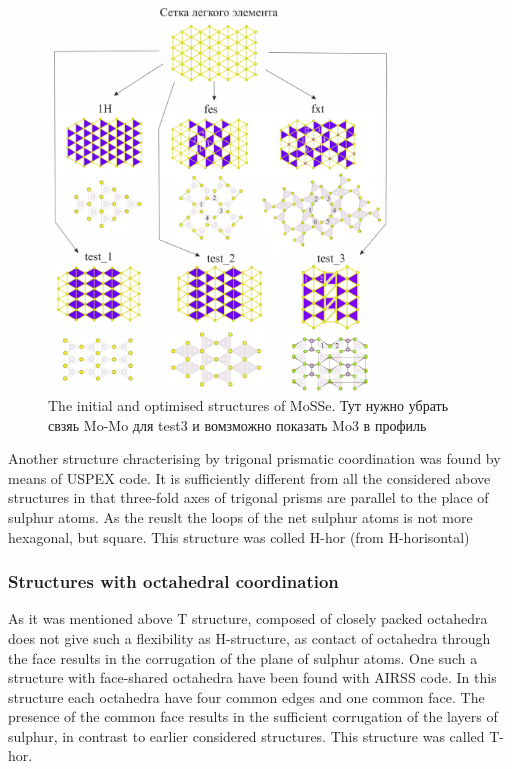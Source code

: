 \documentclass[a4paperm]{article}
\begin{document}
\begin{figure}[H] \centering
        \includegraphics[width=0.8\textwidth]{H-based.jpg}
        \caption{The initial and optimised structures of MoSSe. Тут нужно убрать свзяь Mo-Mo для test3 и вомзможно показать Mo3 в профиль}
\label{H-based}
\end{figure}


Another structure chracterising by trigonal prismatic coordination was found by means of USPEX code.
It is sufficiently different from all the considered above structures in that three-fold axes of trigonal prisms are parallel to the place of sulphur atoms.
As the reuslt the loops of the net sulphur atoms is not more hexagonal, but square. 
This structure was colled H-hor (from H-horisontal)

\subsubsection{Structures with octahedral coordination}

As it was mentioned above T structure, composed of closely packed octahedra does not give such a flexibility as H-structure, as contact of octahedra through the face results in the corrugation of the plane of sulphur atoms. 
One such a structure with face-shared octahedra have been found with AIRSS code.
In this structure each octahedra have four common edges and one common face.
The presence of the common face results in the sufficient corrugation of the layers of sulphur, in contrast to earlier considered structures.
This structure was called T-hor.
\end{document}
